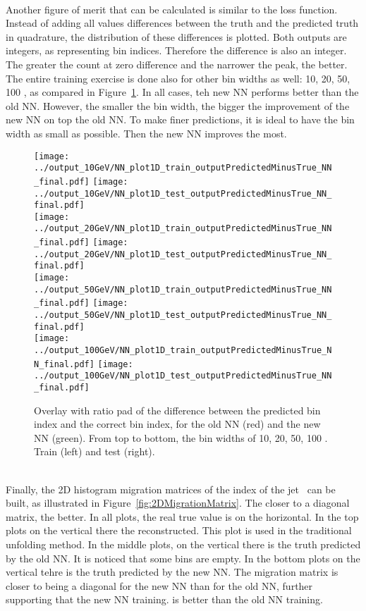 \ \\Another figure of merit that can be calculated is similar to the loss function. Instead of adding all values differences between the truth and the predicted truth in quadrature, the distribution of these differences is plotted. Both outputs are integers, as representing bin indices. Therefore the difference is also an integer. The greater the count at zero difference and the narrower the peak, the better. The entire training exercise is done also for other bin widths as well: 10, 20, 50, 100 \GeV, as compared in Figure~\ref{fig:binIndexPredictedMinusTruel}. In all cases, teh new NN performs better than the old NN. However, the smaller the bin width, the bigger the improvement of the new NN on top the old NN. To make finer predictions, it is ideal to have the bin width as small as possible. Then the new NN improves the most.

\begin{figure}[h]
  \centering
  \texttt{[image: ../output\_10GeV/NN\_plot1D\_train\_outputPredictedMinusTrue\_NN\_final.pdf]}
  \texttt{[image: ../output\_10GeV/NN\_plot1D\_test\_outputPredictedMinusTrue\_NN\_final.pdf]}\\
  \texttt{[image: ../output\_20GeV/NN\_plot1D\_train\_outputPredictedMinusTrue\_NN\_final.pdf]}
  \texttt{[image: ../output\_20GeV/NN\_plot1D\_test\_outputPredictedMinusTrue\_NN\_final.pdf]}\\
  \texttt{[image: ../output\_50GeV/NN\_plot1D\_train\_outputPredictedMinusTrue\_NN\_final.pdf]}
  \texttt{[image: ../output\_50GeV/NN\_plot1D\_test\_outputPredictedMinusTrue\_NN\_final.pdf]}\\
  \texttt{[image: ../output\_100GeV/NN\_plot1D\_train\_outputPredictedMinusTrue\_NN\_final.pdf]}
  \texttt{[image: ../output\_100GeV/NN\_plot1D\_test\_outputPredictedMinusTrue\_NN\_final.pdf]}\\
  \caption{Overlay with ratio pad of the difference between the predicted bin index and the correct bin index, for the old NN (red) and the new NN (green). From top to bottom, the bin widths of 10, 20, 50, 100 \GeV. Train (left) and test (right).}
  \label{fig:binIndexPredictedMinusTruel}
\end{figure}

\ \\Finally, the 2D histogram migration matrices of the index of the jet \pt~can be built, as illustrated in Figure~\ref{fig:2DMigrationMatrix}. The closer to a diagonal matrix, the better. In all plots, the real true value is on the horizontal. In the top plots on the vertical there the reconstructed. This plot is used in the traditional unfolding method. In the middle plots, on the vertical there is the truth predicted by the old NN. It is noticed that some bins are empty. In the bottom plots on the vertical tehre is the truth predicted by the new NN. The migration matrix is closer to being a diagonal for the new NN than for the old NN, further supporting that the new NN training. is better than the old NN training.

